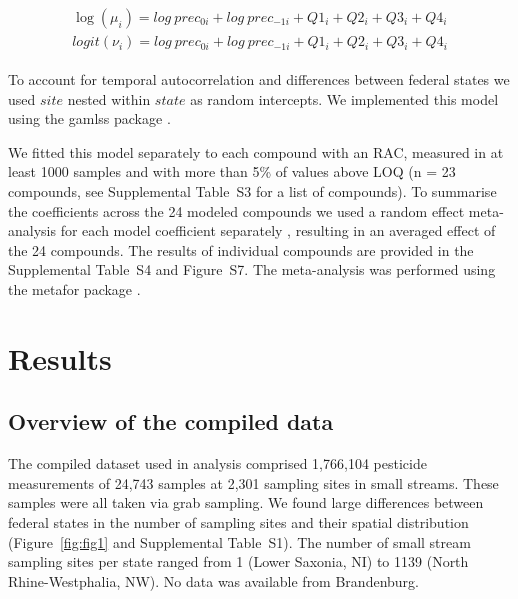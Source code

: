 \documentclass[journal=esthag,manuscript=article]{achemso}
\begin{document}
\begin{align}
\begin{split}
\log(\mu_{i}) = log~prec_{0 i} + log~prec_{-1 i} + Q1_{i} + Q2_{i}+Q3_{i}+Q4_{i}\\
logit(\nu_{i}) = log~prec_{0 i} + log~prec_{-1 i} + Q1_{i} + Q2_{i}+Q3_{i}+Q4_{i}
\end{split}
\label{eqn:eqn4}
\end{align}

To account for temporal autocorrelation and differences between federal states we used $site$ nested within $state$ as random intercepts.
We implemented this model using the gamlss package \cite{stasinopoulos_generalized_2007}. 

We fitted this model separately to each compound with an RAC, measured in at least 1000 samples and with more than 5\% of values above LOQ (n = 23 compounds, see Supplemental Table~S3 for a list of compounds). 
To summarise the coefficients across the 24 modeled compounds we used a random effect meta-analysis for each model coefficient separately \citep{harrison_getting_2011}, resulting in an averaged effect of the 24 compounds.
The results of individual compounds are provided in the Supplemental Table~S4 and Figure~S7.
The meta-analysis was performed using the metafor package \citep{Viechtbauer_2010}. 



\section{Results}
\subsection{Overview of the compiled data}

The compiled dataset used in analysis comprised 1,766,104 pesticide measurements of 24,743 samples at 2,301 sampling sites in small streams.  %
These samples were all taken via grab sampling.  
We found large differences between federal states in the number of sampling sites and their spatial distribution (Figure~\ref{fig:fig1} and Supplemental Table~S1). 
The number of small stream sampling sites per state ranged from 1 (Lower Saxonia, NI) to 1139 (North Rhine-Westphalia, NW).
No data was available from Brandenburg. 
\end{document}
